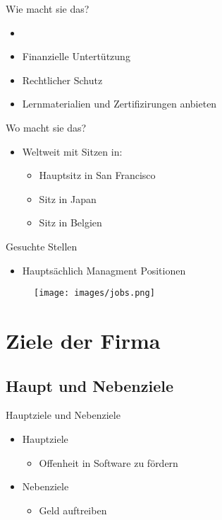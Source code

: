 \documentclass[11pt,aspectratio=169]{beamer}
\begin{document}
\begin{frame}{Wie macht sie das?}
	\begin{itemize}
		\item <1->\cite{Grundprinziepe}
		\item <2->Finanzielle Untertützung
		\item <3->Rechtlicher Schutz
		\item <4->Lernmaterialien und Zertifizirungen anbieten\cite{Training}
	\end{itemize}
\end{frame}
\begin{frame}{Wo macht sie das?}
	\begin{itemize}
		\item Weltweit mit Sitzen in:
		      \begin{itemize}
			      \item Hauptsitz in San Francisco \cite{Locations}
			      \item Sitz in Japan\cite{Locations}
			      \item Sitz in Belgien\cite{Locations}
		      \end{itemize}
	\end{itemize}
\end{frame}
\begin{frame}{Gesuchte Stellen} \begin{itemize}

		\item	Hauptsächlich Managment Positionen
	\end{itemize}
	\begin{figure}
		\centering
		\texttt{[image: images/jobs.png]}\cite{Positionen}
	\end{figure}

\end{frame}
\section {Ziele der Firma}
\subsection {Haupt und Nebenziele}
\begin{frame}{Hauptziele und Nebenziele}
	\begin{itemize}
		\item <1-> Hauptziele
		      \begin{itemize}
			      \item<2->Offenheit in Software zu fördern\cite{Grundprinziepe}
		      \end{itemize}
	\end{itemize}
	\begin{itemize}
		\item <3-> Nebenziele
		      \begin{itemize}
			      \item<4->Geld auftreiben
		      \end{itemize}
	\end{itemize}
\end{frame}
\end{document}
